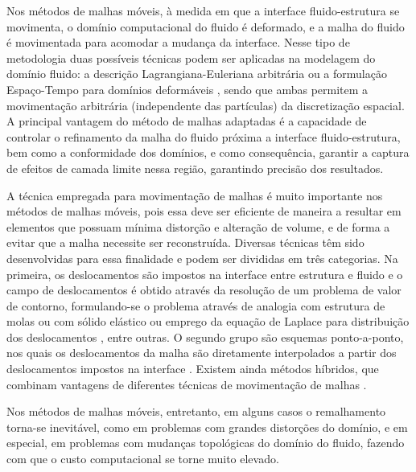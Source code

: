 Nos métodos de malhas móveis, à medida em que a interface fluido-estrutura se movimenta, o domínio computacional do fluido é deformado, e a malha do fluido é movimentada para acomodar a mudança da interface. Nesse tipo de metodologia duas possíveis técnicas podem ser aplicadas na modelagem do domínio fluido: a descrição Lagrangiana-Euleriana arbitrária \cite{DoneaGH:1982,HughesLZ:1981,KanchiM:2007} ou a formulação Espaço-Tempo para domínios deformáveis \cite{TakizawaT:2012,TezduyarBL:1992,TezduyarBML:1992b}, sendo que ambas permitem a movimentação arbitrária (independente das partículas) da discretização espacial. A principal vantagem do método de malhas adaptadas é a capacidade de controlar o refinamento da malha do fluido próxima a interface fluido-estrutura, bem como a conformidade dos domínios, e como consequência, garantir a captura de efeitos de camada limite nessa região, garantindo precisão dos resultados.

A técnica empregada para movimentação de malhas é muito importante nos métodos de malhas móveis, pois essa deve ser eficiente de maneira a resultar em elementos que possuam mínima distorção e alteração de volume, e de forma a evitar que a malha necessite ser reconstruída. Diversas técnicas têm sido desenvolvidas para essa finalidade e podem ser divididas em três categorias. Na primeira, os deslocamentos são impostos na interface entre estrutura e fluido e o campo de deslocamentos é obtido através da resolução de um problema de valor de contorno, formulando-se o problema através de analogia com estrutura de molas \cite{BottassoDS:2005} ou com sólido elástico \cite{JohnsonT:1994,SteinTB:2004} ou emprego da equação de Laplace para distribuição dos deslocamentos \cite{KanchiM:2007}, entre outras. O segundo grupo são esquemas ponto-a-ponto, nos quais os deslocamentos da malha são diretamente interpolados a partir dos deslocamentos impostos na interface \cite{DoneaGH:1982,SanchesC:2014,TezduyarABJ:1993}. Existem ainda métodos híbridos, que combinam vantagens de diferentes técnicas de movimentação de malhas \cite{FernandesCS:2019,Lefrancois:2008}. 

Nos métodos de malhas móveis, entretanto, em alguns casos o remalhamento torna-se inevitável, como em problemas com grandes distorções do domínio, e em especial, em problemas com mudanças topológicas do domínio do fluido, fazendo com que o custo computacional se torne muito elevado.

